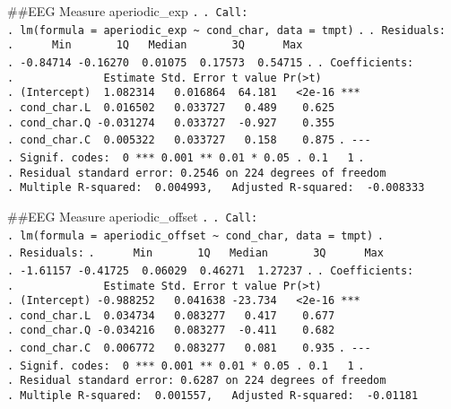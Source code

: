 \documentclass[
]{article}
\begin{document}
\#\#EEG Measure aperiodic\_exp \texttt{.} \texttt{.\ Call:}
\texttt{.\ lm(formula\ =\ aperiodic\_exp\ \textasciitilde{}\ cond\_char,\ data\ =\ tmpt)}
\texttt{.} \texttt{.\ Residuals:}
\texttt{.\ \ \ \ \ \ Min\ \ \ \ \ \ \ 1Q\ \ \ Median\ \ \ \ \ \ \ 3Q\ \ \ \ \ \ Max}
\texttt{.\ -0.84714\ -0.16270\ \ 0.01075\ \ 0.17573\ \ 0.54715}
\texttt{.} \texttt{.\ Coefficients:}
\texttt{.\ \ \ \ \ \ \ \ \ \ \ \ \ \ Estimate\ Std.\ Error\ t\ value\ Pr(\textgreater{}\textbar{}t\textbar{})}
\texttt{.\ (Intercept)\ \ 1.082314\ \ \ 0.016864\ \ 64.181\ \ \ \textless{}2e-16\ ***}
\texttt{.\ cond\_char.L\ \ 0.016502\ \ \ 0.033727\ \ \ 0.489\ \ \ \ 0.625}
\texttt{.\ cond\_char.Q\ -0.031274\ \ \ 0.033727\ \ -0.927\ \ \ \ 0.355}
\texttt{.\ cond\_char.C\ \ 0.005322\ \ \ 0.033727\ \ \ 0.158\ \ \ \ 0.875}
\texttt{.\ -\/-\/-}
\texttt{.\ Signif.\ codes:\ \ 0\ \textquotesingle{}***\textquotesingle{}\ 0.001\ \textquotesingle{}**\textquotesingle{}\ 0.01\ \textquotesingle{}*\textquotesingle{}\ 0.05\ \textquotesingle{}.\textquotesingle{}\ 0.1\ \textquotesingle{}\ \textquotesingle{}\ 1}
\texttt{.}
\texttt{.\ Residual\ standard\ error:\ 0.2546\ on\ 224\ degrees\ of\ freedom}
\texttt{.\ Multiple\ R-squared:\ \ 0.004993,\ \ \ Adjusted\ R-squared:\ \ -0.008333}

\#\#EEG Measure aperiodic\_offset \texttt{.} \texttt{.\ Call:}
\texttt{.\ lm(formula\ =\ aperiodic\_offset\ \textasciitilde{}\ cond\_char,\ data\ =\ tmpt)}
\texttt{.} \texttt{.\ Residuals:}
\texttt{.\ \ \ \ \ \ Min\ \ \ \ \ \ \ 1Q\ \ \ Median\ \ \ \ \ \ \ 3Q\ \ \ \ \ \ Max}
\texttt{.\ -1.61157\ -0.41725\ \ 0.06029\ \ 0.46271\ \ 1.27237}
\texttt{.} \texttt{.\ Coefficients:}
\texttt{.\ \ \ \ \ \ \ \ \ \ \ \ \ \ Estimate\ Std.\ Error\ t\ value\ Pr(\textgreater{}\textbar{}t\textbar{})}
\texttt{.\ (Intercept)\ -0.988252\ \ \ 0.041638\ -23.734\ \ \ \textless{}2e-16\ ***}
\texttt{.\ cond\_char.L\ \ 0.034734\ \ \ 0.083277\ \ \ 0.417\ \ \ \ 0.677}
\texttt{.\ cond\_char.Q\ -0.034216\ \ \ 0.083277\ \ -0.411\ \ \ \ 0.682}
\texttt{.\ cond\_char.C\ \ 0.006772\ \ \ 0.083277\ \ \ 0.081\ \ \ \ 0.935}
\texttt{.\ -\/-\/-}
\texttt{.\ Signif.\ codes:\ \ 0\ \textquotesingle{}***\textquotesingle{}\ 0.001\ \textquotesingle{}**\textquotesingle{}\ 0.01\ \textquotesingle{}*\textquotesingle{}\ 0.05\ \textquotesingle{}.\textquotesingle{}\ 0.1\ \textquotesingle{}\ \textquotesingle{}\ 1}
\texttt{.}
\texttt{.\ Residual\ standard\ error:\ 0.6287\ on\ 224\ degrees\ of\ freedom}
\texttt{.\ Multiple\ R-squared:\ \ 0.001557,\ \ \ Adjusted\ R-squared:\ \ -0.01181}
\end{document}

